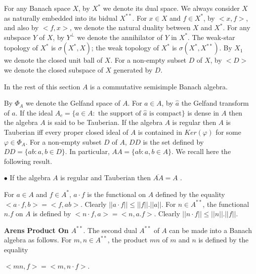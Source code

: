 \documentclass[12pt, twoside, leqno]{article}
\theoremstyle{definition}
\theoremstyle{definition}
\numberwithin{equation}{section}
\begin{document}
For any Banach space $ X $, by $ X^{*}$ we denote its dual space. We always consider $ X $ as naturally embedded into its bidual $ X^{**} $. For $ x \in X $ and $ f \in X^{*} $, by $ < x,f >  $, and also by $ < f,x > $, we denote the natural duality between  $ X $ and $ X^{*} $. For any subspace $ Y $ of $ X $, by $ Y^{\perp} $ we denote the annihilator of $ Y $ in $X^{*}$. The weak-star topology of $ X^{*} $ is $ \sigma(X^{*},X) $; the weak topology of $ X^{*} $ is $ \sigma(X^{*},X^{**}) $. By $ X_{1} $ we denote the closed unit ball of $ X $. For a non-empty subset $ D $ of $ X $, by $ <D> $ we denote the closed subspace of $ X $ generated by $ D $.\vspace{2mm}

In the rest of this section $ A $ is a commutative semisimple Banach algebra.\vspace{2mm}

By $ \Phi_{A} $ we denote the Gelfand space of $ A $. For $ a\in A $, by $ \hat{a} $ the Gelfand transform of $ a $. If the ideal $ A_{c}=\{a\in A:\text{ the  support of  $\hat{a}$ is compact} \} $ is dense in $ A $ then the algebra $ A $ is said to be Tauberian. If the algebra $ A $ is regular then $ A $ is Tauberian iff every proper closed ideal of $ A $ is contained in $ Ker(\varphi) $ for some $ \varphi\in\Phi_{A}$. For a non-empty subset $ D $ of $ A $, $ DD $ is the set defined by $ DD=\{ab:a,b\in D\} $. In particular, $AA=\{ab:a,b\in A\}$. We recall here the following result.\vspace{2mm}

$\bullet$ If the algebra $ A $ is regular and Tauberian then $ \overline{AA}=A $ \cite [Proposition 3.1.10]{dales_ulger_01}.\vspace{2mm}

For $ a\in A $ and $ f\in A^{*} $, $ a\cdot f $ is the functional on $ A $ defined by the equality $ <a\cdot f,b>=<f,ab> $. Clearly $ ||a\cdot f||\leq ||f||.||a|| $.  For $ n\in A^{**} $, the functional $ n.f $ on $ A $ is defined by $ <n\cdot f,a>=<n,a.f> $. Clearly $ ||n\cdot f||\leq ||n||.||f|| $.\vspace{2mm} 

\textbf{Arens Product On $ A^{**} $}. The second dual $ A^{**} $ of $ A $ can be made into a Banach algebra as follows. For $ m,n\in A^{**} $, the product $ mn $ of $ m $ and $ n $ is defined by the equality\vspace{2mm}

$ <mn,f>=<m,n\cdot f> $.\vspace{2mm}
\end{document}
